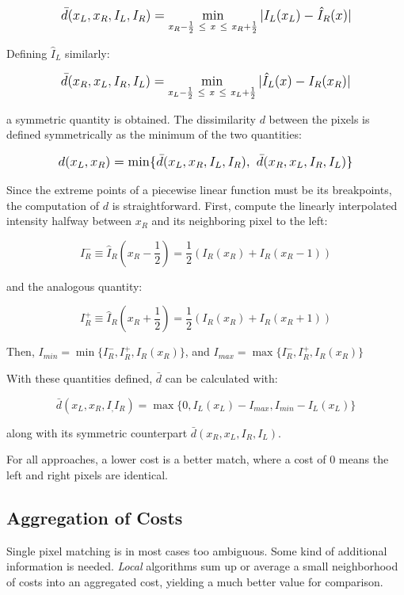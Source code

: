 \[ \mathlarger{\bar{d}(x_L, x_R, I_L, I_R) = \min_{x_R - \frac{1}{2}\  \le\  x\ \le \ x_R + \frac{1}{2}} | I_L(x_L) - \hat{I}_R(x) |} \]

Defining $\hat{I}_L$ similarly:

\[\mathlarger{
  \bar{d}(x_R, x_L, I_R, I_L) = \min_{x_L - \frac{1}{2}\  \le\  x\
    \le \ x_L + \frac{1}{2}} | \hat{I}_L(x) - I_R(x_R) |
}\]

a symmetric quantity is obtained. The dissimilarity $d$ between the pixels is
defined symmetrically as the minimum of the two quantities:

\begin{equation}
\label{eq:btd}
  \mathlarger{
    d(x_L,x_R) = \min \{\bar{d}(x_L,x_R,I_L,I_R),\  \bar{d}(x_R,x_L,I_R,I_L) \}
  }
\end{equation}

Since the extreme points of a piecewise linear function must be its
breakpoints, the computation of $d$ is straightforward. First, compute the
linearly interpolated intensity halfway between $x_R$ and its neighboring
pixel to the left:

\[
I^{-}_{R} \equiv{} \hat{I}_R ( x_R - \frac{1}{2}) =
\frac{1}{2}(I_R(x_R) + I_R(x_R - 1))
\]

and the analogous quantity:

\[
I^{+}_{R} \equiv{} \hat{I}_R ( x_R + \frac{1}{2}) =
\frac{1}{2}(I_R(x_R) + I_R(x_R + 1))
\]

Then, $I_{min} = \min\{I^{-}_{R},I^{+}_{R},I_{R}(x_R)\}$, and $I_{max}
= \max\{I^{-}_{R},I^{+}_{R},I_{R}(x_R)\}$

With these quantities defined, $\bar{d}$ can be calculated with:

\[
\bar{d}(x_L,x_R,I_,I_R) = \max\{0,I_L(x_L) - I_{max},I_{min} - I_L(x_L)\}
\]

along with its symmetric counterpart $\bar{d}(x_R,x_L,I_R,I_L)$.

For all approaches, a lower cost is a better match, where a cost of 0
means the left and right pixels are identical.

\subsection{Aggregation of Costs}
\label{sec:aggregatecost}

Single pixel matching is in most cases too ambiguous. Some kind of additional
information is needed. \textit{Local} algorithms sum up or average a small
neighborhood of costs into an aggregated cost, yielding a much better value
for comparison.

